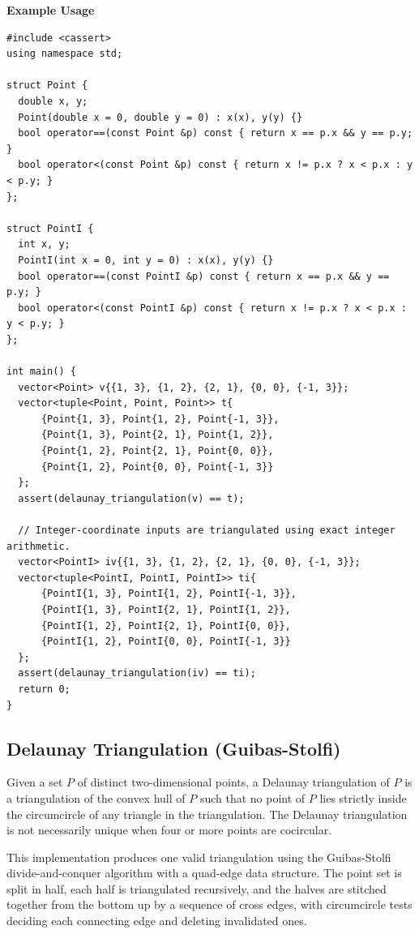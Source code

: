 \textbf{Example Usage}\par
\begin{lstlisting}[style=cpp]
#include <cassert>
using namespace std;

struct Point {
  double x, y;
  Point(double x = 0, double y = 0) : x(x), y(y) {}
  bool operator==(const Point &p) const { return x == p.x && y == p.y; }
  bool operator<(const Point &p) const { return x != p.x ? x < p.x : y < p.y; }
};

struct PointI {
  int x, y;
  PointI(int x = 0, int y = 0) : x(x), y(y) {}
  bool operator==(const PointI &p) const { return x == p.x && y == p.y; }
  bool operator<(const PointI &p) const { return x != p.x ? x < p.x : y < p.y; }
};

int main() {
  vector<Point> v{{1, 3}, {1, 2}, {2, 1}, {0, 0}, {-1, 3}};
  vector<tuple<Point, Point, Point>> t{
      {Point{1, 3}, Point{1, 2}, Point{-1, 3}},
      {Point{1, 3}, Point{2, 1}, Point{1, 2}},
      {Point{1, 2}, Point{2, 1}, Point{0, 0}},
      {Point{1, 2}, Point{0, 0}, Point{-1, 3}}
  };
  assert(delaunay_triangulation(v) == t);

  // Integer-coordinate inputs are triangulated using exact integer arithmetic.
  vector<PointI> iv{{1, 3}, {1, 2}, {2, 1}, {0, 0}, {-1, 3}};
  vector<tuple<PointI, PointI, PointI>> ti{
      {PointI{1, 3}, PointI{1, 2}, PointI{-1, 3}},
      {PointI{1, 3}, PointI{2, 1}, PointI{1, 2}},
      {PointI{1, 2}, PointI{2, 1}, PointI{0, 0}},
      {PointI{1, 2}, PointI{0, 0}, PointI{-1, 3}}
  };
  assert(delaunay_triangulation(iv) == ti);
  return 0;
}
\end{lstlisting}
\subsection{Delaunay Triangulation (Guibas-Stolfi)}
\label{sec:7.4.6}
Given a set $P$ of distinct two-dimensional points, a Delaunay triangulation of $P$ is a triangulation of the convex hull of $P$ such that no point of $P$ lies strictly inside the circumcircle of any triangle in the triangulation. The Delaunay triangulation is not necessarily unique when four or more points are cocircular.

This implementation produces one valid triangulation using the Guibas-Stolfi divide-and-conquer algorithm with a quad-edge data structure. The point set is split in half, each half is triangulated recursively, and the halves are stitched together from the bottom up by a sequence of cross edges, with circumcircle tests deciding each connecting edge and deleting invalidated ones.

